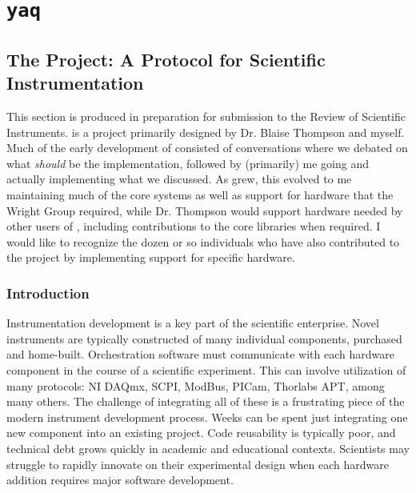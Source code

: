 \chapter{\texttt{yaq}} \label{cha:yaq}

\newcommand\yaqcqtpy{\texttt{yaqc-qtpy}}
\clearpage

\section{The \yaq{} Project: A Protocol for Scientific Instrumentation}



This section is produced in preparation for submission to the Review of Scientific Instruments.
\yaq{} is a project primarily designed by Dr. Blaise Thompson and myself.
Much of the early development of \yaq{} consisted of conversations where we debated on what \textit{should} be the implementation, followed by (primarily) me going and actually implementing what we discussed.
As \yaq{} grew, this evolved to me maintaining much of the core systems as well as support for hardware that the Wright Group required, while Dr. Thompson would support hardware needed by other users of \yaq{}, including contributions to the core libraries when required.
I would like to recognize the dozen or so individuals who have also contributed to the \yaq{} project by implementing support for specific hardware.

\subsection{Introduction}

Instrumentation development is a key part of the scientific enterprise.
Novel instruments are typically constructed of many individual components, purchased and home-built.
Orchestration software must communicate with each hardware component in the course of a scientific experiment.
This can involve utilization of many protocols: NI DAQmx\cite{nidaqmx}, SCPI\cite{scpi}, ModBus\cite{modbus}, PICam\cite{picam}, Thorlabs APT\cite{thorlabs_apt}, among many others.
The challenge of integrating all of these is a frustrating piece of the modern instrument development process.
Weeks can be spent just integrating one new component into an existing project.
Code reusability is typically poor, and technical debt grows quickly in academic and educational contexts.
Scientists may struggle to rapidly innovate on their experimental design when each hardware addition requires major software development.

